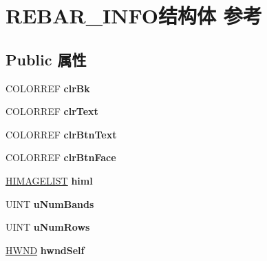 \hypertarget{struct_r_e_b_a_r___i_n_f_o}{}\section{R\+E\+B\+A\+R\+\_\+\+I\+N\+F\+O结构体 参考}
\label{struct_r_e_b_a_r___i_n_f_o}
\subsection*{Public 属性}
\begin{DoxyCompactItemize}
\item 
\mbox{\label{struct_r_e_b_a_r___i_n_f_o_a61d2f46ba7cf1fa57c75ca318fafd15c}} 
C\+O\+L\+O\+R\+R\+EF {\bfseries clr\+Bk}
\item 
\mbox{\label{struct_r_e_b_a_r___i_n_f_o_ac9fc6415ffb8cf02945dfc26498a110a}} 
C\+O\+L\+O\+R\+R\+EF {\bfseries clr\+Text}
\item 
\mbox{\label{struct_r_e_b_a_r___i_n_f_o_ab5d13e2f9566cf91b813d49df3beb0f8}} 
C\+O\+L\+O\+R\+R\+EF {\bfseries clr\+Btn\+Text}
\item 
\mbox{\label{struct_r_e_b_a_r___i_n_f_o_a6bd0b91811f0da48ba43112d4b3e1e9c}} 
C\+O\+L\+O\+R\+R\+EF {\bfseries clr\+Btn\+Face}
\item 
\mbox{\label{struct_r_e_b_a_r___i_n_f_o_a58e69fc895a2068d08bc99b7fb4e6dde}} 
\hyperlink{struct___i_m_a_g_e_l_i_s_t}{H\+I\+M\+A\+G\+E\+L\+I\+ST} {\bfseries himl}
\item 
\mbox{\label{struct_r_e_b_a_r___i_n_f_o_ab018725b9ab66c819db3d51804444353}} 
U\+I\+NT {\bfseries u\+Num\+Bands}
\item 
\mbox{\label{struct_r_e_b_a_r___i_n_f_o_acb6f9532a1572d1669c1b9f70c6b6918}} 
U\+I\+NT {\bfseries u\+Num\+Rows}
\item 
\mbox{\label{struct_r_e_b_a_r___i_n_f_o_a652b82f9aa3c2ac33dfb5f57fd671f92}} 
\hyperlink{interfacevoid}{H\+W\+ND} {\bfseries hwnd\+Self}
\item 

\end{DoxyCompactItemize}
